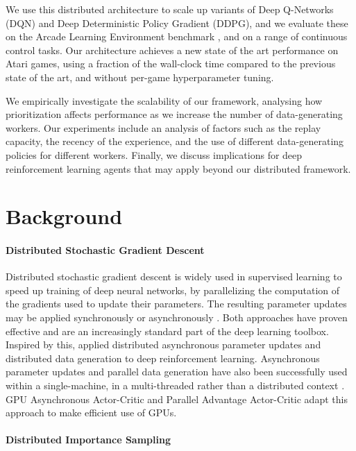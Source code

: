 \documentclass{article} \PassOptionsToPackage{usenames,dvipsnames}{xcolor}
\begin{document}
We use this distributed architecture to scale up variants of Deep Q-Networks (DQN) and Deep Deterministic Policy Gradient (DDPG), and we evaluate these on the Arcade Learning Environment benchmark \citep{bellemare2013arcade}, and on a range of continuous control tasks. Our architecture achieves a new state of the art performance on Atari games, using a fraction of the wall-clock time compared to the previous state of the art, and without per-game hyperparameter tuning.

We empirically investigate the scalability of our framework, analysing how prioritization affects performance as we increase the number of data-generating workers. Our experiments include an analysis of factors such as the replay capacity, the recency of the experience, and the use of different data-generating policies for different workers. Finally, we discuss implications for deep reinforcement learning agents that may apply beyond our distributed framework.

\section{Background}

\paragraph{Distributed Stochastic Gradient Descent}

Distributed stochastic gradient descent is widely used in supervised learning to speed up training of deep neural networks, by parallelizing the computation of the gradients used to update their parameters. The resulting parameter updates may be applied synchronously \citep{krizhevsky2014one} or asynchronously \citep{Dean:2012:LSD:2999134.2999271}. Both approaches have proven effective and are an increasingly standard part of the deep learning toolbox. Inspired by this, \cite{gorila} applied distributed asynchronous parameter updates and distributed data generation to deep reinforcement learning. Asynchronous parameter updates and parallel data generation have also been successfully used within a single-machine, in a multi-threaded rather than a distributed context \citep{a3c}. GPU Asynchronous Actor-Critic \citep[GA3C;][]{ga3c} and Parallel Advantage Actor-Critic \citep[PAAC;][]{paac} adapt this approach to make efficient use of GPUs.

\paragraph{Distributed Importance Sampling}
\end{document}
